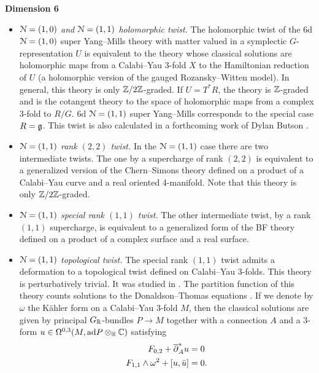 \documentclass[10pt, oneside]{article}
\begin{document}
\textbf{Dimension 6}
\begin{itemize}
 \item \emph{$\mathcal{N}=(1,0)$ and $\mathcal{N}=(1,1)$ holomorphic twist.} The holomorphic twist of the 6d $\mathcal N=(1, 0)$ super Yang--Mills theory with matter valued in a symplectic $G$-representation $U$ is equivalent to the theory whose classical solutions are holomorphic maps from a Calabi--Yau 3-fold $X$ to the Hamiltonian reduction of $U$ (a holomorphic version of the gauged Rozansky--Witten model). In general, this theory is only $\mathbb Z/2\mathbb Z$-graded. If $U=T^*R$, the theory is $\mathbb Z$-graded and is the cotangent theory to the space of holomorphic maps from a complex 3-fold to $R/G$. 6d $\mathcal N=(1, 1)$ super Yang--Mills corresponds to the special case $R=\mathfrak g$. This twist is also calculated in a forthcoming work of Dylan Butson \cite{Butson}.
 \item \emph{$\mathcal{N}=(1,1)$ rank $(2, 2)$ twist.} In the $\mathcal{N}=(1,1)$ case there are two intermediate twists. The one by a supercharge of rank $(2, 2)$ is equivalent to a generalized version of the Chern--Simons theory defined on a product of a Calabi--Yau curve and a real oriented 4-manifold. Note that this theory is only $\mathbb Z/2\mathbb Z$-graded.
 \item \emph{$\mathcal{N}=(1,1)$ special rank $(1,1)$ twist.} The other intermediate twist, by a rank $(1, 1)$ supercharge, is equivalent to a generalized form of the BF theory defined on a product of a complex surface and a real surface.
 \item \emph{$\mathcal{N}=(1,1)$ topological twist.} The special rank $(1, 1)$ twist admits a deformation to a topological twist defined on Calabi--Yau 3-folds. This theory is perturbatively trivial. It was studied in \cite{AcharyaOLoughlinSpence, BaulieuKannoSinger}. The partition function of this theory counts solutions to the Donaldson--Thomas equations \cite{Thomas}. If we denote by $\omega$ the K\"ahler form on a Calabi--Yau 3-fold $M$, then the classical solutions are given by principal $G_\mathbb R$-bundles $P\rightarrow M$ together with a connection $A$ and a 3-form $u\in\Omega^{0, 3}(M, \mathrm{ad} P\otimes_\mathbb R \mathbb C)$ satisfying
\begin{align}
F_{0, 2} + \overline{\partial}^*_A u &= 0 \\
F_{1, 1}\wedge \omega^2 + [u, \bar{u}] &= 0.
\end{align}
\end{itemize}
\end{document}
